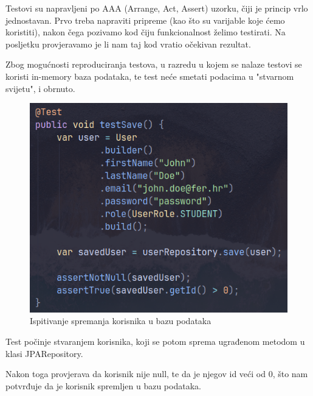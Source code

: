 Testovi su napravljeni po AAA (Arrange, Act, Assert) uzorku, čiji je princip 
vrlo jednostavan. Prvo treba napraviti pripreme (kao što su varijable koje 
ćemo koristiti), nakon čega pozivamo kod čiju funkcionalnost želimo testirati. 
Na posljetku provjeravamo je li nam taj kod vratio očekivan 
rezultat.

Zbog mogućnosti reproduciranja testova, u razredu u kojem se nalaze testovi se 
koristi in-memory baza podataka, te test neće smetati podacima u "stvarnom 
svijetu", i obrnuto.

\begin{figure}[H]
	\includegraphics[scale=0.6]{slike/test_1.png}
	\centering
	\caption{Ispitivanje spremanja korisnika u bazu podataka}
	\label{fig:test_1}

\end{figure}

Test počinje stvaranjem korisnika, koji se potom sprema ugrađenom metodom u 
klasi JPARepository.

Nakon toga provjerava da korisnik nije null, te da je njegov id veći od 0, što 
nam potvrđuje da je korisnik spremljen u bazu podataka.

